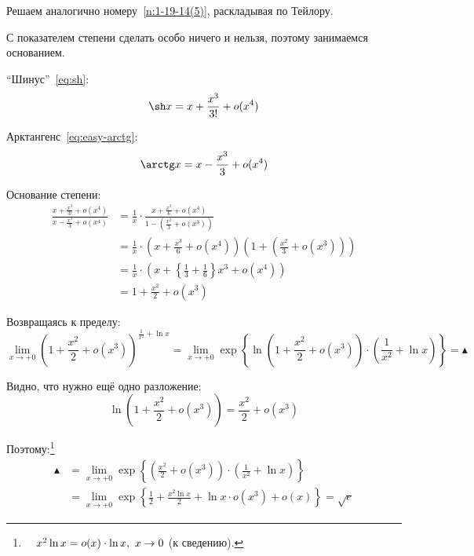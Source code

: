 \documentclass[a4paper,12pt]{article}
\begin{document}
  \begin{solution}
    Решаем аналогично номеру~\ref{n:1-19-14(5)}, раскладывая по Тейлору.

    С показателем степени сделать особо ничего и нельзя, поэтому занимаемся основанием.

    ``Шинус''~\eqref{eq:sh}:
    \[
      \sh x = x + \frac{x^3}{3!} + o(x^4)
    \]

    Арктангенс~\eqref{eq:easy-arctg}:
    \[
      \arctg x = x - \frac{x^3}{3} + o(x^4)
    \]

    Основание степени:
    \begin{equation*}
    \begin{split}
      \frac{x + \frac{x^3}{3!} + o(x^4)}{x - \frac{x^3}{3} + o(x^4)} &= \frac{1}{x} \cdot \frac{x + \frac{x^3}{6} + o(x^4)}{1 - \left(\frac{x^2}{3} + o(x^3)\right)}\\
      &= \frac{1}{x} \cdot \left(x + \frac{x^3}{6} + o(x^4)\right) \left(1 + \left(\frac{x^2}{3} + o(x^3)\right)\right)\\
      &= \frac{1}{x} \cdot \left(x + \left\{\frac{1}{3} + \frac{1}{6}\right\}x^3 + o(x^4)\right)\\
      &= 1 + \frac{x^2}{2} + o(x^3)
    \end{split}
    \end{equation*}

    Возвращаясь к пределу:
    \[
      \lim_{x \to +0} \left(
        1 + \frac{x^2}{2} + o(x^3)
      \right)^{
        \frac{1}{x^2} + \ln x
      }
      = \lim_{x \to +0} \exp \left\{ \ln\left(
        1 + \frac{x^2}{2} + o(x^3)
      \right) \cdot \left(
        \frac{1}{x^2} + \ln x
      \right)\right\}
      = \blacktriangle
    \]

    Видно, что нужно ещё одно разложение:
    \[
      \ln\left(1 + \frac{x^2}{2} + o(x^3)\right) = \frac{x^2}{2} + o(x^3)
    \]

    Поэтому:\footnote{
      ${}\quad x^2 \ln x \hm= o(x) \hm\cdot \ln x,\ x \hm\to 0$ (к сведению).
    }
    \begin{equation*}
    \begin{split}
      \blacktriangle &= \lim_{x \to +0} \exp \left\{ \left(
        \frac{x^2}{2} + o(x^3)
      \right) \cdot \left(
        \frac{1}{x^2} + \ln x
      \right)\right\}\\
      &= \lim_{x \to +0} \exp \left\{\frac{1}{2} + \frac{x^2 \ln x}{2} + \ln x \cdot o(x^3) + o(x)\right\}
      = \sqrt{e}
    \end{split}
    \end{equation*}
  \end{solution}
\end{document}
